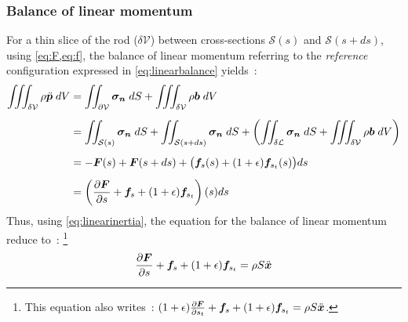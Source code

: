 \subsubsection{Balance of linear momentum}
For a thin slice of the rod ($\delta\mathcal{V}$) between cross-sections $\mathcal{S}(s)$ and $\mathcal{S}(s+ds)$, using \cref{eq:F,eq:f}, the balance of linear momentum referring to the \emph{reference} configuration expressed in \cref{eq:linearbalance} yields~: 
\begin{equation}
	\begin{aligned}
		\iiint_{\delta\mathcal{V}} \rho \ddot{\boldsymbol{p}} \;dV 
		&= \iint_{\partial\mathcal{V}} \boldsymbol{\sigma_n} \;dS 
		+ \iiint_{\delta\mathcal{V}} \rho \boldsymbol{b} \;dV
		\\[0.5em]
		&= \iint_{\mathcal{S}(s)} \boldsymbol{\sigma_n} \;dS 
		+ \iint_{\mathcal{S}(s+ds)} \boldsymbol{\sigma_n} \;dS
		+ \left( \iint_{\delta\mathcal{L}} \boldsymbol{\sigma_n} \;dS
		+ \iiint_{\delta\mathcal{V}} \rho \boldsymbol{b} \;dV \right)
		\\[0.5em]
		&= -\boldsymbol{F}(s) + \boldsymbol{F}(s+ds) + \big(\boldsymbol{f}_{s} (s) + (1+\epsilon) \boldsymbol{f}_{s_t}(s) \big) ds
		\\[0.5em]
		&= \left( \frac{\partial \boldsymbol{F}}{\partial s} + \boldsymbol{f}_{s}  + (1+\epsilon) \boldsymbol{f}_{s_t} \right)(s) ds
	\end{aligned}
\end{equation}
Thus, using \cref{eq:linearinertia}, the equation for the balance of linear momentum reduce to~: \footnote{This equation also writes~: $(1+\epsilon)\frac{\partial \boldsymbol{F}}{\partial s_t} + \boldsymbol{f}_{s}  + (1+\epsilon)\boldsymbol{f}_{s_t} = \rho S \ddot{\boldsymbol{x}}$.}
\begin{equation}
	\frac{\partial \boldsymbol{F}}{\partial s} + \boldsymbol{f}_{s}  + (1+\epsilon)\boldsymbol{f}_{s_t} = \rho S \ddot{\boldsymbol{x}}
	\label{eq:linearmotion}
\end{equation}

